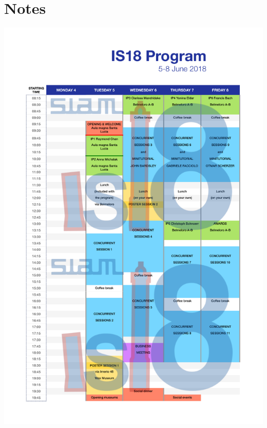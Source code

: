 \documentclass[twoside]{book}
\begin{document}
%

%

\newpage
\part{Notes}
\thispagestyle{empty}
\includegraphics[scale=0.6]{program_table.pdf}
\end{document}

